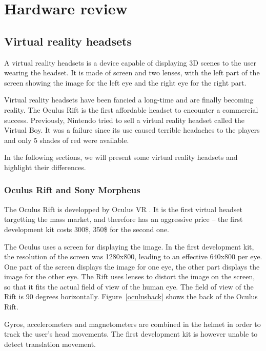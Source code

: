 \documentclass[12pt]{article}
\begin{document}
\section{Hardware review}
\subsection{Virtual reality headsets}
A virtual reality headsets is a device capable of displaying 3D scenes to the user wearing the headset. It is made of screen and two lenses, with the left part of the screen showing the image for the left eye and the right eye for the right part.

Virtual reality headsets have been fancied a long-time and are finally becoming reality. The Oculus Rift is the first affordable headset to encounter a commercial success. Previously, Nintendo tried to sell a virtual reality headset called the Virtual Boy. It was a failure since its use caused terrible headaches to the players and only 5 shades of red were available.

In the following sections, we will present some virtual reality headsets and highlight their differences.

\subsubsection{Oculus Rift and Sony Morpheus}
The Oculus Rift is developped by Oculus VR \cite{Oculus}. It is the first virtual headset targetting the mass market, and therefore has an aggressive price -- the first development kit costs 300\$, 350\$ for the second one.

The Oculus uses a screen for displaying the image. In the first development kit, the resolution of the screen was 1280x800, leading to an effective 640x800 per eye. One part of the screen displays the image for one eye, the other part displays the image for the other eye. The Rift uses lenses to distort the image on the screen, so that it fits the actual field of view of the human eye. The field of view of the Rift is 90 degrees horizontally. Figure~\ref{oculusback} shows the back of the Oculus Rift.

Gyros, accelerometers and magnetometers are combined in the helmet in order to track the user's head movements. The first development kit is however unable to detect translation movement.
\end{document}
